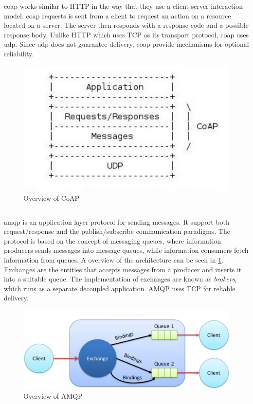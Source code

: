 \gls{coap} works similar to HTTP in the way that they use a client-server
interaction model. \gls{coap} requests is sent from a client to request an
action on a resource located on a server. The server then responds with a
response code and a possible response body. Unlike HTTP which uses TCP as its
transport protocol, \gls{coap} uses \gls{udp}. Since \gls{udp} does not
guarantee delivery, \gls{coap} provide mechanisms for optional reliability.

\begin{figure}[h]
\centering
\includegraphics[scale=0.6]{images/coap.pdf}
\caption{Overview of CoAP}
\end{figure}


\subsection{}

\gls{amqp} is an application layer protocol for sending messages. It support
both request/response and the publish/subscribe communication paradigms. The
protocol is based on the concept of messaging queues, where information
producers sends messages into message queues, while information consumers fetch
information from queues. A overview of the architecture can be seen in
\cref{figure-amqp}. Exchanges are the entities that accepts messages from a
producer and inserts it into a suitable queue. The implementation of exchanges
are known as \textit{brokers}, which runs as a separate decoupled application.
AMQP uses TCP for reliable delivery.

\begin{figure}[h]
\includegraphics[scale=0.35]{images/amqp.pdf}
\caption{Overview of AMQP}
\label{figure-amqp}
\end{figure}

